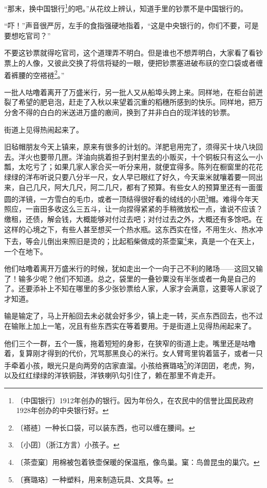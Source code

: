 \documentclass[12pt,UTF-8,openany]{ctexbook}
\begin{document}
\begin{normalsize}
    “那末，换中国银行\footnote{〔中国银行〕1912年创办的银行。因为年份久，在农民中的信誉比国民政府1928年创办的中央银行好。}的吧。”从花纹上辨认，知道手里的钞票不是中国银行的。
    
    “吓！”声音很严厉，左手的食指强硬地指着，“这是中央银行的，你们不要，可是要想吃官司？”
    
    不要这钞票就得吃官司，这个道理弄不明白。但是谁也不想弄明白，大家看了看钞票上的人像，又彼此交换了将信将疑的一眼，便把钞票塞进破布祆的空口袋或者缠着裤腰的空褡裢\footnote{〔褡裢〕一种长口袋，可以装东西，也可以缠在腰间。}。”
    
    一批人咕噜着离开了万盛米行，另一批人又从船埠头跨上来。同样地，在柜台前迸裂了希望的肥皂泡，赶走了入秋以来望着沉重的稻穗所感到的快乐。同样地，把万分舍不得的白白的米送进万盛的廒间，换到了并非白白的现洋钱的钞票。
    
    街道上见得热闹起来了。
    
    旧毡帽朋友今天上镇来，原来有很多的计划的。洋肥皂用完了，须得买十块八块回去。洋火也要带几匣。洋油向挑着担子到村里去的小贩买，十个铜板只有这么一小瓢，太吃亏了；如果几家人家合买一听分来用，就便宜得多。陈列在橱窗里的花花绿绿的洋布听说只要八分半一尺，女人早已眼红了好久，今天粜米就嚷着要一同出来，自己几尺，阿大几尺，阿二几尺，都有了预算。有些女人的预算里还有一面蛋圆的洋镜，一方雪白的毛巾，或者一顶结得很好看的绒线的小囝\footnote{〔小囝〕（浙江方言）小孩子。}帽。难得今年天照应，一亩田多收这么三五斗，让一向捏得紧紧的手稍微放松一点，谁说不应该？缴租，还债，解会钱，大概能够对付过去吧；对付过去之外，大概还有多馀吧。在这样的心境之下，有些人甚至想买一个热水瓶。这东西实在怪，不用生火、热水冲下去，等会儿倒出来照旧是烫的；比起稻柴做成的茶壶窠\footnote{〔茶壶窠〕用棉被包着铁壶保暖的保温瓶，像鸟巢。窠：鸟兽昆虫的巢穴。}来，真是一个在天上，一个在地下。
    
    他们咕噜着离开万盛米行的时候，犹如走出一个一向于己不利的赌场——这回又输了！输多少呢？他们不知道。总之，袋里的一叠钞粟没有半张或者一角是自己的了。还要添补上不知在哪里的多少张钞票给人家，人家才会满意，这要等人家说了才知道。
    
    输是输定了，马上开船回去未必就会好多少，镇上走一转，买点东西回去，也不过在输账上加上一笔，况且有些东西实在等着要用。于是街道上见得热闹起来了。
    
    他们三个一群，五个一簇，拖着短短的身影，在狭窄的街道上走。嘴里还是咕噜着，复算刚才得到的代价，咒骂那黑良心的米行。女人臂弯里钩着篮子，或者一只手牵着小孩，眼光只是向两旁的店家直溜。小孩给赛璐珞\footnote{〔赛璐珞〕一种塑料，用来制造玩具、文具等。}的洋囝囝，老虎，狗，以及红红绿绿的洋铁铜鼓，洋铁喇叭勾引住了，赖在那里不肯走开。
    

\end{normalsize}
\end{document}

